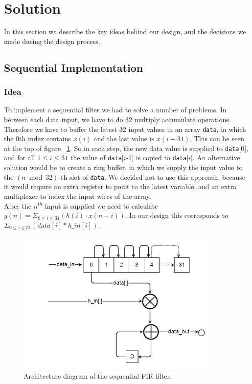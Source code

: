 \section{Solution}
In this section we describe the key ideas behind our design, and the decisions we made during the design process.
\subsection{Sequential Implementation}
\subsubsection{Idea}
To implement a sequential filter we had to solve a number of problems. In between each data input, we have to do 32 multiply accumulate operations. Therefore we have to buffer the latest 32 input values in an array \texttt{data}, in which the 0th index contains $x(i)$ and the last value is $x(i -31)$. This can be seen at the top of figure ~\ref{fig:architecture}. So in each step, the new data value is supplied to \texttt{data}[0], and for all $1 \leq i \leq 31$ the value of \texttt{data}[$i$-1] is copied to \texttt{data}[$i$]. An alternative solution would be to create a ring buffer, in which we supply the input value to the $(n\bmod 32)$-th slot of \texttt{data}. We decided not to use this approach, because it would require an extra register to point to the latest variable, and an extra multiplexer to index the input wires of the array.\\
After the $n^{th}$ input is supplied we need to calculate $y(n)=\Sigma_{0\leq i \leq 31}(h(i)\cdot x(n-i))$. In our design this corresponds to $\Sigma_{0 \leq i \leq 31}(data[i] * h\_in[i])$.  

\begin{figure}
\includegraphics[width=0.9\textwidth]{images/architecture.png}
\caption{Architecture diagram of the sequential FIR filter.}
\label{fig:architecture}
\end{figure}

